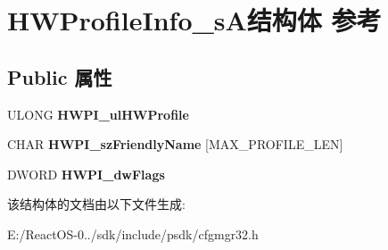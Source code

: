 \hypertarget{struct_h_w_profile_info__s_a}{}\section{H\+W\+Profile\+Info\+\_\+s\+A结构体 参考}
\label{struct_h_w_profile_info__s_a}
\subsection*{Public 属性}
\begin{DoxyCompactItemize}
\item 
\mbox{\label{struct_h_w_profile_info__s_a_a0858dc085aa644b41e19d37ebdbc0690}} 
U\+L\+O\+NG {\bfseries H\+W\+P\+I\+\_\+ul\+H\+W\+Profile}
\item 
\mbox{\label{struct_h_w_profile_info__s_a_a8ba08522dfe4a3fd195ce9c1db352b58}} 
C\+H\+AR {\bfseries H\+W\+P\+I\+\_\+sz\+Friendly\+Name} \mbox{[}M\+A\+X\+\_\+\+P\+R\+O\+F\+I\+L\+E\+\_\+\+L\+EN\mbox{]}
\item 
\mbox{\label{struct_h_w_profile_info__s_a_abedd1709455f55020184f42b9fa7c0d3}} 
D\+W\+O\+RD {\bfseries H\+W\+P\+I\+\_\+dw\+Flags}
\end{DoxyCompactItemize}


该结构体的文档由以下文件生成\+:\begin{DoxyCompactItemize}
\item 
E\+:/\+React\+O\+S-\/0../sdk/include/psdk/cfgmgr32.\+h\end{DoxyCompactItemize}
